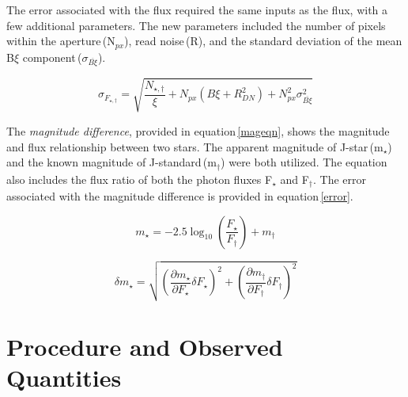 \documentclass[onecolumn]{aastex6}
\begin{document}
The error associated with the flux required the same inputs as the flux, with a few additional parameters. The new parameters included the number of pixels within the aperture\,(N$_{px}$), read noise\,(R), and the standard deviation of the mean B$\xi$ component\,($\sigma_{\overline{B\xi}}$).

\begin{equation}
\sigma_{F_{\star,\dagger}} = \sqrt{\frac{N_{\star,\dagger}}{\xi} +  N_{px}(B\xi + R_{DN}^2) + N_{px}^2\sigma_{\overline{B\xi}}^2               }
\end{equation}


The \textit{magnitude difference}, provided in equation\,\ref{mageqn}, shows the magnitude and flux relationship between two stars. The apparent magnitude of J-star\,(m$_{\star}$) and the known magnitude of J-standard\,(m$_{\dagger}$) were both utilized. The equation also includes the flux ratio of both the photon fluxes F$_{\star}$ and F$_{\dagger}$. The error associated with the magnitude difference is provided in equation\,\ref{error}. 


\begin{equation}
m_{\star}=-2.5\log_{10}{\left( \frac{F_{\star}}{F_{\dagger}}\right)}+m_{\dagger}
\label{mageqn}
\end{equation}


\begin{equation}
\delta m_{\star} = \sqrt{\left(\frac{\partial m_{\star}}{\partial F_{\star}}\delta F_{\star}\right)^2 + \left(\frac{\partial m_{\dagger}}{\partial F_{\dagger}}\delta F_{\dagger}\right)^2}
\label{error}
\end{equation}




\clearpage
\section{Procedure and Observed Quantities}
\end{document}
